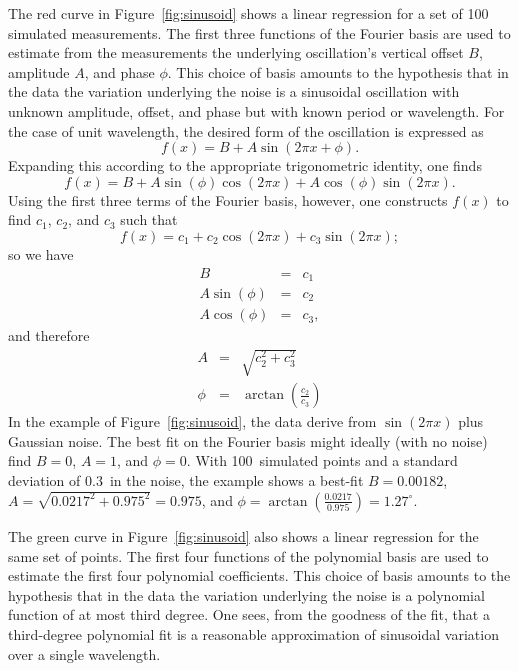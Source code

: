 \documentclass[twocolumn]{article}
\begin{document}
The red curve in Figure~\ref{fig:sinusoid} shows a linear regression for a set
of 100 simulated measurements. The first three functions of the Fourier basis
are used to estimate from the measurements the underlying oscillation's
vertical offset $B$, amplitude $A$, and phase $\phi$. This choice of basis
amounts to the hypothesis that in the data the variation underlying the noise
is a sinusoidal oscillation with unknown amplitude, offset, and phase but with
known period or wavelength.  For the case of unit wavelength, the desired form
of the oscillation is expressed as
\begin{equation}
   f(x) = B + A \sin(2\pi x + \phi).
\end{equation}
Expanding this according to the appropriate trigonometric identity, one finds
\begin{equation}
   f(x) = B + A \sin(\phi) \cos(2\pi x) + A \cos(\phi) \sin(2\pi x).
\end{equation}
Using the first three terms of the Fourier basis, however, one constructs
$f(x)$ to find $c_1$, $c_2$, and $c_3$ such that
\begin{equation}
   f(x) = c_1 + c_2 \cos(2\pi x) + c_3 \sin(2\pi x);
\end{equation}
so we have
\begin{eqnarray}
   B &=& c_1\\
   A \sin(\phi) &=& c_2\\
   A \cos(\phi) &=& c_3,
\end{eqnarray}
and therefore
\begin{eqnarray}
   A    &=& \sqrt{c_2^2 + c_3^2}\\
   \phi &=& \arctan\left(\frac{c_2}{c_3}\right)
\end{eqnarray}
In the example of Figure~\ref{fig:sinusoid}, the data derive from $\sin(2\pi
x)$ plus Gaussian noise. The best fit on the Fourier basis might ideally (with
no noise) find $B = 0$, $A = 1$, and $\phi = 0$. With 100~simulated points and
a standard deviation of 0.3~in the noise, the example shows a best-fit $B =
0.00182$, $A = \sqrt{0.0217^2 + 0.975^2} = 0.975$, and $\phi =
\arctan(\tfrac{0.0217}{0.975}) = 1.27^\circ$.

The green curve in Figure~\ref{fig:sinusoid} also shows a linear regression for
the same set of points. The first four functions of the polynomial basis are
used to estimate the first four polynomial coefficients. This choice of basis
amounts to the hypothesis that in the data the variation underlying the noise
is a polynomial function of at most third degree. One sees, from the goodness
of the fit, that a third-degree polynomial fit is a reasonable approximation of
sinusoidal variation over a single wavelength.
\end{document}
